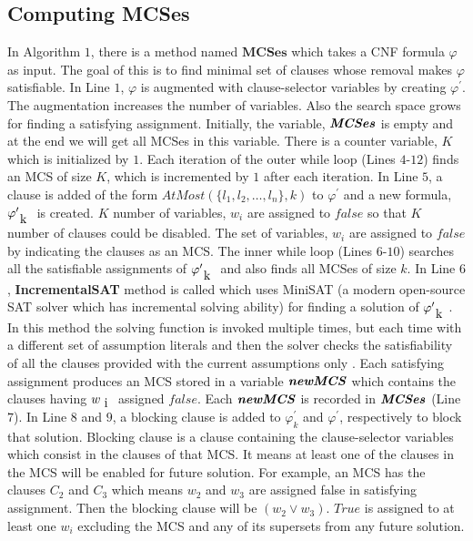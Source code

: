\subsection{Computing MCSes}
In Algorithm $1$, there is a method named $\textbf{MCSes}$ which takes a CNF formula $\varphi$ as input. The goal of this is to find minimal set of clauses whose removal makes $\varphi$ satisfiable. In Line $1$, $\varphi$ is augmented with clause-selector variables by creating $\varphi^{\prime}$. The augmentation increases the number of variables. Also the search space grows for finding a satisfying assignment. Initially, the variable, $\textbf{\textit{MCSes}}$ is empty and  at the end we will get all MCSes in this variable. There is a counter variable, $K$ which is initialized by $1$.\newline
Each iteration of the outer while loop (Lines $4$-$12$) finds an MCS of size $K$, which is incremented by $1$ after each iteration. In Line $5$, a clause is added of the form $AtMost(\{l_{1},l_{2},\ldots,l_{n}\},k)$ to $\varphi^{\prime}$ and a new formula, $\varphi^{\prime}_{\text k}$ is created. $K$ number of variables, $w_{i}$ are assigned to $false$ so that $K$ number of clauses could be disabled. The set of variables, $w_{i}$ are assigned to $false$ by indicating the clauses as an MCS.\newline
The inner while loop (Lines $6$-$10$) searches all the satisfiable assignments of $\varphi^{\prime}_{\text k}$ and also finds all MCSes of size $k$. In Line $6$, \textbf{IncrementalSAT} method is called which uses MiniSAT (a modern open-source SAT solver which has incremental solving ability) for finding a solution of $\varphi^{\prime}_{\text k}$. In this method the solving function is invoked multiple times, but each time with a different set of assumption literals and then the solver checks the satisfiability of all the clauses provided with the current assumptions only \cite{nadel}. Each satisfying assignment produces an MCS stored in a variable $\textbf{\textit{newMCS}}$ which contains the clauses having $w_{\text i}$ assigned $false$. Each $\textbf{\textit{newMCS}}$ is recorded in $\textbf{\textit{MCSes}}$ (Line $7$). In Line $8$ and $9$, a blocking clause is added to $\varphi^{\prime}_{k}$ and $\varphi^{\prime}$, respectively to block that solution. Blocking clause is a clause containing the clause-selector variables which consist in the clauses of that MCS. It means at least one of the clauses in the MCS will be enabled for future solution. For example, an MCS has the clauses $C_{2}$ and $C_{3}$ which means $w_{2}$ and $w_{3}$ are assigned false in satisfying assignment. Then the blocking clause will be $(w_{2}\vee w_{3})$. $True$ is assigned to at least one $w_{i}$ excluding the MCS and any of its supersets from any future solution.\newline
